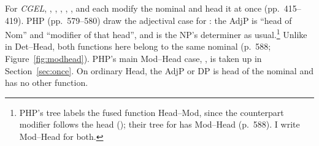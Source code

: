 \ea\label{ex:mh}
\ea {}
\ex {}
\ex {}
\ex {}
\ex {}
\ex {}
\z\z

For \textit{CGEL}, , , , , , and  each modify the nominal and head it at once (pp.~415--419). PHP (pp.~579--580) draw the adjectival case for : the AdjP is \enquote{head of Nom} and \enquote{modifier of that head}, and  is the NP's determiner as usual.\footnote{PHP's tree labels the fused function Head--Mod, since the counterpart modifier follows the head (); their tree for  has Mod--Head (p.~588). I write Mod--Head for both.} Unlike in Det--Head, both functions here belong to the same nominal (p.~588; Figure~\ref{fig:modhead}). PHP's main Mod--Head case, , is taken up in Section~\ref{sec:once}. On ordinary Head, the AdjP or DP is head of the nominal and has no other function.

